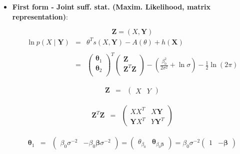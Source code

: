 \documentclass[11pt, oneside]{article}   	%
\newcommand{\bm}{\mathbf}
\newcommand{\bs}{\boldsymbol}
\numberwithin{figure}{section}
\numberwithin{equation}{section}
\numberwithin{table}{section}
\theoremstyle{definition}
\begin{document}
\begin{appendices}
\newcommand{\Z}{\bm Z}
\newcommand{\Y}{\bm Y}
\newcommand{\thb}{\bs \theta}
\newcommand{\beb}{\bs \beta}

\begin{itemize}
\item \textbf{First form - Joint suff. stat. (Maxim. Likelihood, matrix representation)}:

$$\bm Z = ( X, \bm Y)$$
\begin{eqnarray*}
\ln p(X \mid \mathbf{Y}) &=& \theta^T s(X,\mathbf{Y}) - A(\theta) + h(\mathbf{X})\\\\
&=&
\begin{pmatrix}
\thb_1 \\
\thb_2 \\
\end{pmatrix}^T
\begin{pmatrix}
\Z   \\
\Z^T\Z   \\
\end{pmatrix}
- \left( \frac{\beta_0^2}{2\sigma^2} + \ln{\sigma}\right) - \tfrac{1}{2}\ln{(2\pi)}
\end{eqnarray*}




\begin{eqnarray*}
\Z &=& 
\begin{pmatrix}
X & Y
\end{pmatrix}
\end{eqnarray*}

\begin{eqnarray*}
\Z^T\Z &=& 
\begin{pmatrix}
XX^T   & X\Y \\
\Y X^T & Y \Y^T
\end{pmatrix}
\end{eqnarray*}

\begin{eqnarray*}
\thb_1 &=& 
\begin{pmatrix}
\beta_0\sigma^{-2} & -\beta_0\beb\sigma^{-2}
\end{pmatrix}
=
\begin{pmatrix}
\theta_{\beta_0} & \thb_{\beta_0\beb}
\end{pmatrix}
=\beta_0\sigma^{-2}
\begin{pmatrix}
1 & -\beb
\end{pmatrix}
\end{eqnarray*}


\end{itemize}
\end{appendices}
\end{document}
